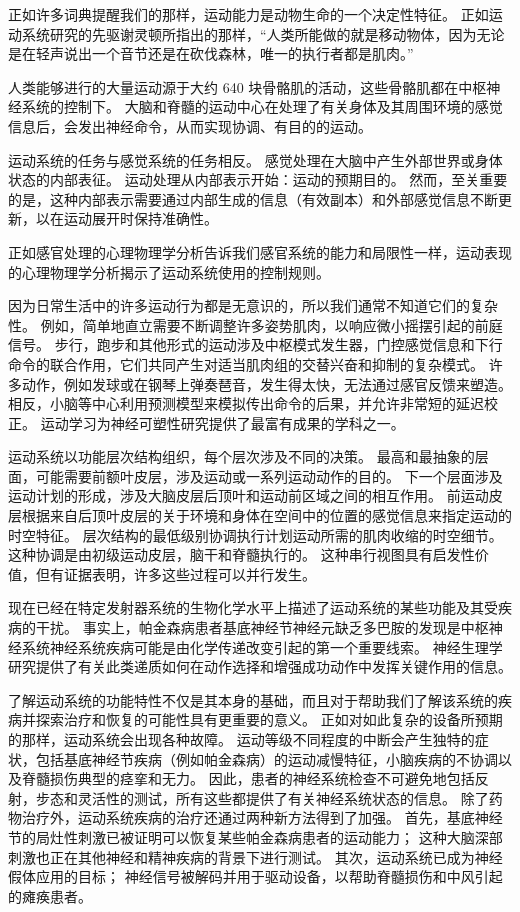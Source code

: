 正如许多词典提醒我们的那样，运动能力是动物生命的一个决定性特征。
正如运动系统研究的先驱谢灵顿所指出的那样，“人类所能做的就是移动物体，因为无论是在轻声说出一个音节还是在砍伐森林，唯一的执行者都是肌肉。”


人类能够进行的大量运动源于大约 640 块骨骼肌的活动，这些骨骼肌都在中枢神经系统的控制下。
大脑和脊髓的运动中心在处理了有关身体及其周围环境的感觉信息后，会发出神经命令，从而实现协调、有目的的运动。


运动系统的任务与感觉系统的任务相反。
感觉处理在大脑中产生外部世界或身体状态的内部表征。
运动处理从内部表示开始：运动的预期目的。
然而，至关重要的是，这种内部表示需要通过内部生成的信息（有效副本）和外部感觉信息不断更新，以在运动展开时保持准确性。


正如感官处理的心理物理学分析告诉我们感官系统的能力和局限性一样，运动表现的心理物理学分析揭示了运动系统使用的控制规则。


因为日常生活中的许多运动行为都是无意识的，所以我们通常不知道它们的复杂性。
例如，简单地直立需要不断调整许多姿势肌肉，以响应微小摇摆引起的前庭信号。
步行，跑步和其他形式的运动涉及中枢模式发生器，门控感觉信息和下行命令的联合作用，它们共同产生对适当肌肉组的交替兴奋和抑制的复杂模式。
许多动作，例如发球或在钢琴上弹奏琶音，发生得太快，无法通过感官反馈来塑造。
相反，小脑等中心利用预测模型来模拟传出命令的后果，并允许非常短的延迟校正。
运动学习为神经可塑性研究提供了最富有成果的学科之一。


运动系统以功能层次结构组织，每个层次涉及不同的决策。
最高和最抽象的层面，可能需要前额叶皮层，涉及运动或一系列运动动作的目的。
下一个层面涉及运动计划的形成，涉及大脑皮层后顶叶和运动前区域之间的相互作用。
前运动皮层根据来自后顶叶皮层的关于环境和身体在空间中的位置的感觉信息来指定运动的时空特征。
层次结构的最低级别协调执行计划运动所需的肌肉收缩的时空细节。
这种协调是由初级运动皮层，脑干和脊髓执行的。
这种串行视图具有启发性价值，但有证据表明，许多这些过程可以并行发生。


现在已经在特定发射器系统的生物化学水平上描述了运动系统的某些功能及其受疾病的干扰。
事实上，帕金森病患者基底神经节神经元缺乏多巴胺的发现是中枢神经系统神经系统疾病可能是由化学传递改变引起的第一个重要线索。
神经生理学研究提供了有关此类递质如何在动作选择和增强成功动作中发挥关键作用的信息。


了解运动系统的功能特性不仅是其本身的基础，而且对于帮助我们了解该系统的疾病并探索治疗和恢复的可能性具有更重要的意义。
正如对如此复杂的设备所预期的那样，运动系统会出现各种故障。
运动等级不同程度的中断会产生独特的症状，包括基底神经节疾病（例如帕金森病）的运动减慢特征，小脑疾病的不协调以及脊髓损伤典型的痉挛和无力。
因此，患者的神经系统检查不可避免地包括反射，步态和灵活性的测试，所有这些都提供了有关神经系统状态的信息。
除了药物治疗外，运动系统疾病的治疗还通过两种新方法得到了加强。
首先，基底神经节的局灶性刺激已被证明可以恢复某些帕金森病患者的运动能力；
这种大脑深部刺激也正在其他神经和精神疾病的背景下进行测试。
其次，运动系统已成为神经假体应用的目标；
神经信号被解码并用于驱动设备，以帮助脊髓损伤和中风引起的瘫痪患者。




